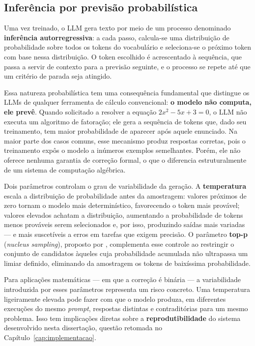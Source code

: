 \subsection{Inferência por previsão probabilística}
\label{sub:inferencia}

Uma vez treinado, o LLM gera texto por meio de um processo denominado \textbf{inferência
autorregressiva}: a cada passo, calcula-se uma distribuição de probabilidade sobre todos os tokens
do vocabulário e seleciona-se o próximo token com base nessa distribuição. O token escolhido é
acrescentado à sequência, que passa a servir de contexto para a previsão seguinte, e o processo se
repete até que um critério de parada seja atingido.

Essa natureza probabilística tem uma consequência fundamental que distingue os LLMs de qualquer
ferramenta de cálculo convencional: \textbf{o modelo não computa, ele prevê}. Quando solicitado a
resolver a equação $2x^2 - 5x + 3 = 0$, o LLM não executa um algoritmo de fatoração; ele gera a
sequência de tokens que, dado seu treinamento, tem maior probabilidade de aparecer após aquele
enunciado. Na maior parte dos casos comuns, esse mecanismo produz respostas corretas, pois o
treinamento expôs o modelo a inúmeros exemplos semelhantes. Porém, ele não oferece nenhuma garantia
de correção formal, o que o diferencia estruturalmente de um sistema de computação algébrica.

Dois parâmetros controlam o grau de variabilidade da geração. A \textbf{temperatura} escala a
distribuição de probabilidade antes da amostragem: valores próximos de zero tornam o modelo mais
determinístico, favorecendo o token mais provável; valores elevados achatam a distribuição,
aumentando a probabilidade de tokens menos prováveis serem selecionados e, por isso, produzindo
saídas mais variadas --- e mais suscetíveis a erros em tarefas que exigem precisão. O parâmetro
\textbf{top-p} (\emph{nucleus sampling}), proposto por \citet{holtzman2020curious}, complementa
esse controle ao restringir o conjunto de candidatos àqueles cuja probabilidade acumulada não
ultrapassa um limiar definido, eliminando da amostragem os tokens de baixíssima probabilidade.

Para aplicações matemáticas --- em que a correção é binária --- a variabilidade introduzida por
esses parâmetros representa um risco concreto. Uma temperatura ligeiramente elevada pode fazer com
que o modelo produza, em diferentes execuções do mesmo \emph{prompt}, respostas distintas e
contraditórias para um mesmo problema. Isso tem implicações diretas sobre a \textbf{reprodutibilidade}
do sistema desenvolvido nesta dissertação, questão retomada no Capítulo~\ref{cap:implementacao}.

